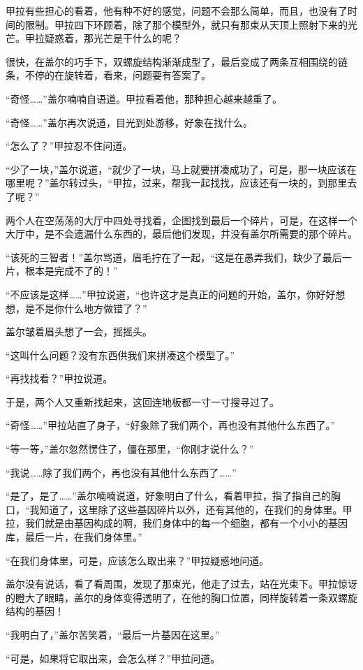 甲拉有些担心的看着，他有种不好的感觉，问题不会那么简单，而且，也没有了时间的限制。甲拉四下环顾着，除了那个模型外，就只有那束从天顶上照射下来的光芒。甲拉疑惑着，那光芒是干什么的呢？ 

很快，在盖尔的巧手下，双螺旋结构渐渐成型了，最后变成了两条互相围绕的链条，不停的在旋转着，看来，问题要有答案了。 

“奇怪……”盖尔喃喃自语道。甲拉看着他，那种担心越来越重了。 

“奇怪……”盖尔再次说道，目光到处游移，好象在找什么。 

“怎么了？”甲拉忍不住问道。 

“少了一块，”盖尔说道，“就少了一块，马上就要拼凑成功了，可是，那一块应该在哪里呢？”盖尔转过头，“甲拉，过来，帮我一起找找，应该还有一块的，到那里去了呢？” 

两个人在空荡荡的大厅中四处寻找着，企图找到最后一个碎片，可是，在这样一个大厅中，是不会遗漏什么东西的，最后他们发现，并没有盖尔所需要的那个碎片。 

“该死的三智者！”盖尔骂道，眉毛拧在了一起，“这是在愚弄我们，缺少了最后一片，根本是完成不了的！” 

“不应该是这样……”甲拉说道，“也许这才是真正的问题的开始，盖尔，你好好想想，是不是你什么地方做错了？” 

盖尔皱着眉头想了一会，摇摇头。 

“这叫什么问题？没有东西供我们来拼凑这个模型了。” 

“再找找看？”甲拉说道。 

于是，两个人又重新找起来，这回连地板都一寸一寸搜寻过了。 

“奇怪……”甲拉站直了身子，“好象除了我们两个，再也没有其他什么东西了。” 

“等一等，”盖尔忽然愣住了，僵在那里，“你刚才说什么？” 

“我说……除了我们两个，再也没有其他什么东西了……” 

“是了，是了……”盖尔喃喃说道，好象明白了什么，看着甲拉，指了指自己的胸口，“我知道了，这里除了这些基因碎片以外，还有其他的，在我们的身体里。甲拉，我们就是由基因构成的啊，我们身体中的每一个细胞，都有一个小小的基因库，最后一片，在我们身体里。” 

“在我们身体里，可是，应该怎么取出来？”甲拉疑惑地问道。 

盖尔没有说话，看了看周围，发现了那束光，他走了过去，站在光束下。甲拉惊讶的瞪大了眼睛，盖尔的身体变得透明了，在他的胸口位置，同样旋转着一条双螺旋结构的基因！ 

“我明白了，”盖尔苦笑着，“最后一片基因在这里。” 

“可是，如果将它取出来，会怎么样？”甲拉问道。 

